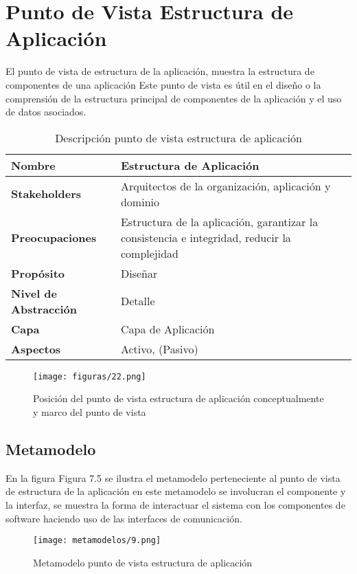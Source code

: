 \section{Punto de Vista Estructura de Aplicación}
El punto de vista de estructura de la aplicación, muestra la estructura de componentes de una aplicación Este punto de vista es útil en el diseño o la comprensión de la estructura principal de componentes de la aplicación y el uso de datos asociados.

  \begin{table}[!h]
  	\centering
  	\begin{tabular}{lp{8cm}}
  		\toprule
  		\textbf{Nombre} & \textbf{Estructura de Aplicación} \\
  		\midrule
  		\textbf{Stakeholders} & Arquitectos de la organización, aplicación y dominio \\
  		\textbf{Preocupaciones} & Estructura de la aplicación, garantizar la consistencia e integridad, reducir la complejidad \\
  		\textbf{Propósito} & Diseñar \\
  		\textbf{Nivel de Abstracción} & Detalle \\
  		\textbf{Capa} & Capa de Aplicación \\
  		\textbf{Aspectos} & Activo, (Pasivo) \\
  		\bottomrule
  	\end{tabular}
  	\captionsetup{width=.95\textwidth}
  	\caption{Descripción punto de vista estructura de aplicación}
  	\label{tabla12}
  \end{table}

  \begin{figure}[!h]
	\centering
	\texttt{[image: figuras/22.png]}
	\captionsetup{width=.95\textwidth}
	\caption{Posición del punto de vista estructura de aplicación conceptualmente y marco del punto de vista}
	\label{figura22}
  \end{figure}

  \subsection{Metamodelo}
  En la figura Figura 7.5 se ilustra el metamodelo perteneciente al punto de vista de estructura de la aplicación en este metamodelo se involucran el componente y la interfaz, se muestra la forma de interactuar el sistema con los componentes de software haciendo uso de las interfaces de comunicación.

  \begin{figure}[!h]
	\centering
	\texttt{[image: metamodelos/9.png]}
	\captionsetup{width=.95\textwidth}
	\caption{Metamodelo punto de vista estructura de aplicación}
	\label{metamodelo9}
  \end{figure}

